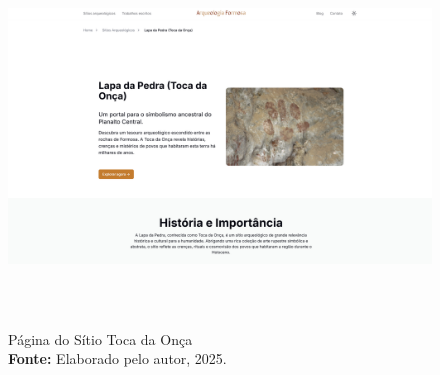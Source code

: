 \begin{figure}[H]
    \centering
    \includegraphics[height=10cm, keepaspectratio]{img/site/pagina_toca_da_onca.png}
    \caption{Página do Sítio Toca da Onça \\
    \textbf{Fonte:} Elaborado pelo autor, 2025.}
    \label{fig:pagina_tocadaonca}
\end{figure}



